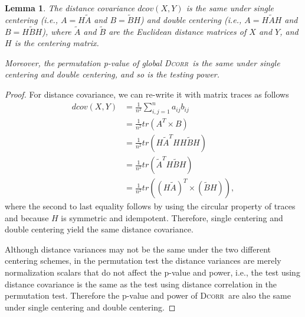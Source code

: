 \documentclass[11pt]{article}
\providecommand{\sct}[1]{{\normalfont\textsc{#1}}}
\newcommand{\Dcorr}{\sct{Dcorr}}
\newtheorem{appLem}{Lemma}
\begin{document}
\begin{appLem}
\label{lem1}
The distance covariance $dcov(X,Y)$ is the same under single centering (i.e., $A=H\tilde{A}$ and $B=\tilde{B}H$) and double centering (i.e., $A=H\tilde{A}H$ and $B=H\tilde{B}H$), where $\tilde{A}$ and $\tilde{B}$ are the Euclidean distance matrices of $X$ and $Y$, and $H$ is the centering matrix. 

Moreover, the permutation p-value of global \Dcorr~is the same under single centering and double centering, and so is the testing power.
\end{appLem}
\begin{proof}
For distance covariance, we can re-write it with matrix traces as follows
\begin{align*}
dcov(X,Y) &= \frac{1}{n^2}\sum_{i,j=1}^{n}a_{ij}b_{ij} \\
 &=\frac{1}{n^2} tr(A^{T} \times B) \\
 &=\frac{1}{n^2} tr(H\tilde{A}^{T}HH\tilde{B}H) \\
 &=\frac{1}{n^2} tr(\tilde{A}^{T}H\tilde{B}H) \\
 &=\frac{1}{n^2} tr((H\tilde{A})^{T} \times (\tilde{B}H)),
\end{align*}
where the second to last equality follows by using the circular property of traces and because $H$ is symmetric and idempotent. Therefore, single centering and double centering yield the same distance covariance.

Although distance variances may not be the same under the two different centering schemes, in the permutation test the distance variances are merely normalization scalars that do not affect the p-value and power, i.e., the test using distance covariance is the same as the test using distance correlation in the permutation test. Therefore the p-value and power of \Dcorr~are also the same under single centering and double centering.
\end{proof}
\end{document}
